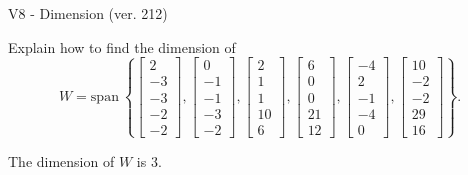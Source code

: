 \begin{exercise}
  \begin{exerciseTitle}V8 - Dimension (ver. 212)\end{exerciseTitle}
  \begin{exerciseStatement}
    Explain how to find the dimension of 
\[W=\mathrm{span}\ \left\{\left[\begin{array}{r}
2 \\
-3 \\
-3 \\
-2 \\
-2
\end{array}\right] , \left[\begin{array}{r}
0 \\
-1 \\
-1 \\
-3 \\
-2
\end{array}\right] , \left[\begin{array}{r}
2 \\
1 \\
1 \\
10 \\
6
\end{array}\right] , \left[\begin{array}{r}
6 \\
0 \\
0 \\
21 \\
12
\end{array}\right] , \left[\begin{array}{r}
-4 \\
2 \\
-1 \\
-4 \\
0
\end{array}\right] , \left[\begin{array}{r}
10 \\
-2 \\
-2 \\
29 \\
16
\end{array}\right]\right\}.\]



  \end{exerciseStatement}
  \begin{exerciseAnswer}
   The dimension of \(W\) is  \(3\).
  


  \end{exerciseAnswer}
\end{exercise}